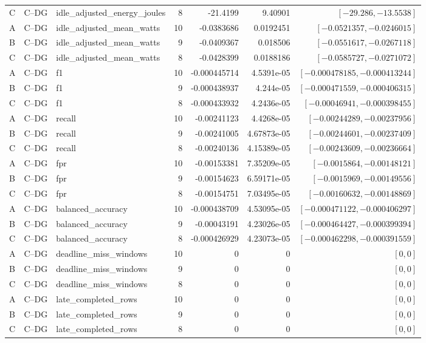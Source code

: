 \begin{longtable}{lllrrrr}
C & C--DG & idle\_adjusted\_energy\_joules & 8 & -21.4199 & 9.40901 & $[-29.286,-13.5538]$\\
A & C--DG & idle\_adjusted\_mean\_watts & 10 & -0.0383686 & 0.0192451 & $[-0.0521357,-0.0246015]$\\
B & C--DG & idle\_adjusted\_mean\_watts & 9 & -0.0409367 & 0.018506 & $[-0.0551617,-0.0267118]$\\
C & C--DG & idle\_adjusted\_mean\_watts & 8 & -0.0428399 & 0.0188186 & $[-0.0585727,-0.0271072]$\\
A & C--DG & f1 & 10 & -0.000445714 & 4.5391e-05 & $[-0.000478185,-0.000413244]$\\
B & C--DG & f1 & 9 & -0.000438937 & 4.244e-05 & $[-0.000471559,-0.000406315]$\\
C & C--DG & f1 & 8 & -0.000433932 & 4.2436e-05 & $[-0.00046941,-0.000398455]$\\
A & C--DG & recall & 10 & -0.00241123 & 4.4268e-05 & $[-0.00244289,-0.00237956]$\\
B & C--DG & recall & 9 & -0.00241005 & 4.67873e-05 & $[-0.00244601,-0.00237409]$\\
C & C--DG & recall & 8 & -0.00240136 & 4.15389e-05 & $[-0.00243609,-0.00236664]$\\
A & C--DG & fpr & 10 & -0.00153381 & 7.35209e-05 & $[-0.0015864,-0.00148121]$\\
B & C--DG & fpr & 9 & -0.00154623 & 6.59171e-05 & $[-0.0015969,-0.00149556]$\\
C & C--DG & fpr & 8 & -0.00154751 & 7.03495e-05 & $[-0.00160632,-0.00148869]$\\
A & C--DG & balanced\_accuracy & 10 & -0.000438709 & 4.53095e-05 & $[-0.000471122,-0.000406297]$\\
B & C--DG & balanced\_accuracy & 9 & -0.00043191 & 4.23026e-05 & $[-0.000464427,-0.000399394]$\\
C & C--DG & balanced\_accuracy & 8 & -0.000426929 & 4.23073e-05 & $[-0.000462298,-0.000391559]$\\
A & C--DG & deadline\_miss\_windows & 10 & 0 & 0 & $[0,0]$\\
B & C--DG & deadline\_miss\_windows & 9 & 0 & 0 & $[0,0]$\\
C & C--DG & deadline\_miss\_windows & 8 & 0 & 0 & $[0,0]$\\
A & C--DG & late\_completed\_rows & 10 & 0 & 0 & $[0,0]$\\
B & C--DG & late\_completed\_rows & 9 & 0 & 0 & $[0,0]$\\
C & C--DG & late\_completed\_rows & 8 & 0 & 0 & $[0,0]$\\

\end{longtable}
